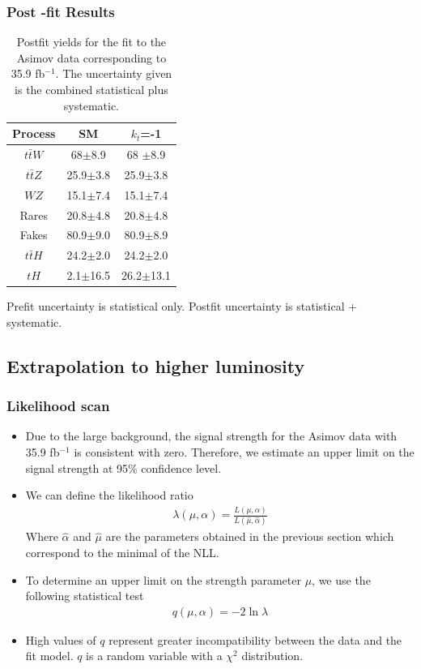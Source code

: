 \documentclass[11pt]{beamer}
\begin{document}
\begin{frame}
\frametitle{Post -fit Results}
	\begin{table}[ht!]
		\centering
		\caption*{Postfit yields for the fit to the Asimov data corresponding to 35.9 fb$^{-1}$. The uncertainty given is the combined statistical plus systematic.}
		\begin{tabular}{ccc}
			\hline
			Process & SM & $k_{t}$=-1 \\
			\hline
			$t\bar{t}W$ & 68$\pm$8.9& 68 $\pm$8.9 \\
			$t\bar{t}Z$ & 25.9$\pm$3.8&25.9$\pm$3.8\\
			$WZ$ & 15.1$\pm$7.4& 15.1$\pm$7.4\\
			Rares & 20.8$\pm$4.8& 20.8$\pm$4.8 \\
			Fakes & 80.9$\pm$9.0& 80.9$\pm$8.9 \\
			$t\bar{t}H$ & 24.2$\pm$2.0 & 24.2$\pm$2.0 \\
			\hline
			$tH$& 2.1$\pm$16.5 &26.2$\pm$13.1 
		\end{tabular}
		\label{table1}
	\end{table}
 Prefit uncertainty is statistical only. Postfit uncertainty is statistical + systematic.
\end{frame}



\begin{frame}
	\subsection{Extrapolation to higher luminosity}
\frametitle{Likelihood scan}
{\small
	\begin{itemize}
\item Due to the large background, the signal strength for the Asimov data with 35.9 fb$^{-1}$ is consistent with zero.
Therefore, we estimate an upper limit on the signal strength at 95$\%$ confidence level.
\item We can define the likelihood ratio
\begin{align}
\lambda(\mu,\alpha)=\frac{L(\mu,\alpha)}{L(\hat{\mu},\hat{\alpha})}
\end{align}
Where $\hat{\alpha}$ and $\hat{\mu}$ are the parameters obtained in the previous section which correspond to the minimal of the NLL.
\item To determine an upper limit on the strength parameter $\mu$, we use the following statistical test
\begin{align}
q(\mu,\alpha)= -2\ln{\lambda} 
\end{align}
\item High values of $q$ represent greater incompatibility between the data and the fit model.
$q$ is a random variable with a $\chi^2$ distribution.
\end{itemize}
}
\end{frame}
\end{document}
